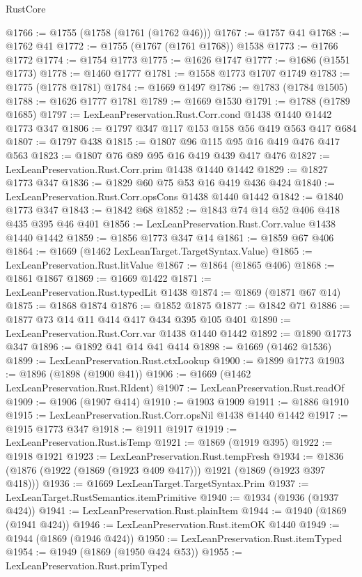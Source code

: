 \begin{lexlean}{RustCore}
\begin{coremodule}
@1766 := @1755 (@1758 (@1761 (@1762 @46)))
@1767 := @1757 @41
@1768 := @1762 @41
@1772 := @1755 (@1767 (@1761 @1768)) @1538
@1773 := @1766 @1772
@1774 := @1754 @1773
@1775 := @1626 @1747
@1777 := @1686 (@1551 @1773)
@1778 := @1460 @1777
@1781 := @1558 @1773 @1707 @1749
@1783 := @1775 (@1778 @1781)
@1784 := @1669 @1497
@1786 := @1783 (@1784 @1505)
@1788 := @1626 @1777 @1781
@1789 := @1669 @1530
@1791 := @1788 (@1789 @1685)
@1797 := LexLeanPreservation.Rust.Corr.cond @1438 @1440 @1442 @1773 @347
@1806 := @1797 @347 @117 @153 @158 @56 @419 @563 @417 @684
@1807 := @1797 @438
@1815 := @1807 @96 @115 @95 @16 @419 @476 @417 @563
@1823 := @1807 @76 @89 @95 @16 @419 @439 @417 @476
@1827 := LexLeanPreservation.Rust.Corr.prim @1438 @1440 @1442
@1829 := @1827 @1773 @347
@1836 := @1829 @60 @75 @53 @16 @419 @436 @424
@1840 := LexLeanPreservation.Rust.Corr.opsCons @1438 @1440 @1442
@1842 := @1840 @1773 @347
@1843 := @1842 @68
@1852 := @1843 @74 @14 @52 @406 @418 @435 @395 @46 @401
@1856 := LexLeanPreservation.Rust.Corr.value @1438 @1440 @1442
@1859 := @1856 @1773 @347 @14
@1861 := @1859 @67 @406
@1864 := @1669 (@1462 LexLeanTarget.TargetSyntax.Value)
@1865 := LexLeanPreservation.Rust.litValue
@1867 := @1864 (@1865 @406)
@1868 := @1861 @1867
@1869 := @1669 @1422
@1871 := LexLeanPreservation.Rust.typedLit @1438
@1874 := @1869 (@1871 @67 @14)
@1875 := @1868 @1874
@1876 := @1852 @1875
@1877 := @1842 @71
@1886 := @1877 @73 @14 @11 @414 @417 @434 @395 @105 @401
@1890 := LexLeanPreservation.Rust.Corr.var @1438 @1440 @1442
@1892 := @1890 @1773 @347
@1896 := @1892 @41 @14 @41 @414
@1898 := @1669 (@1462 @1536)
@1899 := LexLeanPreservation.Rust.ctxLookup
@1900 := @1899 @1773
@1903 := @1896 (@1898 (@1900 @41))
@1906 := @1669 (@1462 LexLeanPreservation.Rust.RIdent)
@1907 := LexLeanPreservation.Rust.readOf
@1909 := @1906 (@1907 @414)
@1910 := @1903 @1909
@1911 := @1886 @1910
@1915 := LexLeanPreservation.Rust.Corr.opsNil @1438 @1440 @1442
@1917 := @1915 @1773 @347
@1918 := @1911 @1917
@1919 := LexLeanPreservation.Rust.isTemp
@1921 := @1869 (@1919 @395)
@1922 := @1918 @1921
@1923 := LexLeanPreservation.Rust.tempFresh
@1934 := @1836 (@1876 (@1922 (@1869 (@1923 @409 @417))) @1921 (@1869 (@1923 @397 @418)))
@1936 := @1669 LexLeanTarget.TargetSyntax.Prim
@1937 := LexLeanTarget.RustSemantics.itemPrimitive
@1940 := @1934 (@1936 (@1937 @424))
@1941 := LexLeanPreservation.Rust.plainItem
@1944 := @1940 (@1869 (@1941 @424))
@1946 := LexLeanPreservation.Rust.itemOK @1440
@1949 := @1944 (@1869 (@1946 @424))
@1950 := LexLeanPreservation.Rust.itemTyped
@1954 := @1949 (@1869 (@1950 @424 @53))
@1955 := LexLeanPreservation.Rust.primTyped

\end{coremodule}
\end{lexlean}
